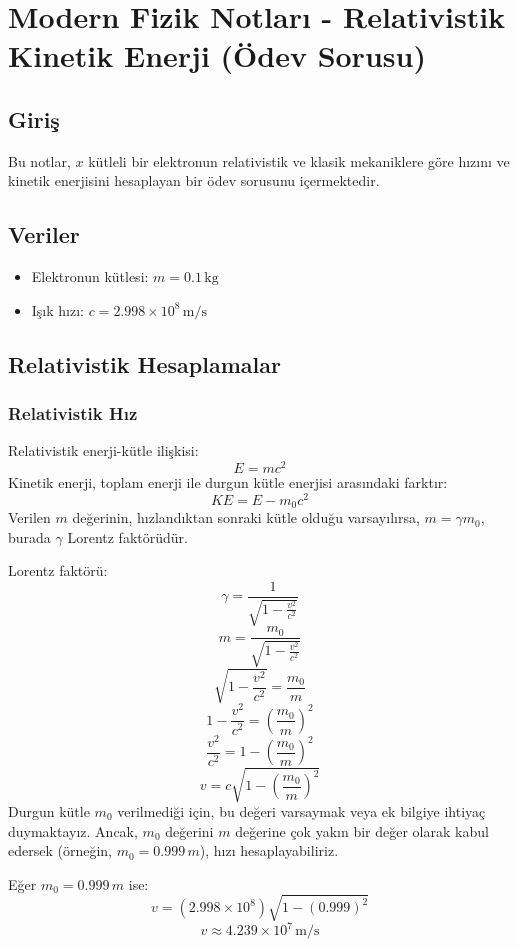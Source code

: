 \documentclass{article}
\begin{document}
\section{Modern Fizik Notları - Relativistik Kinetik Enerji (Ödev Sorusu)}

\subsection{Giriş}
Bu notlar, \( x \) kütleli bir elektronun relativistik ve klasik mekaniklere göre hızını ve kinetik enerjisini hesaplayan bir ödev sorusunu içermektedir.

\subsection{Veriler}
\begin{itemize}
    \item Elektronun kütlesi: \( m = 0.1 \, \text{kg} \)
    \item Işık hızı: \( c = 2.998 \times 10^8 \, \text{m/s} \)
\end{itemize}

\subsection{Relativistik Hesaplamalar}
\subsubsection{Relativistik Hız}
Relativistik enerji-kütle ilişkisi:
\[ E = mc^2 \]
Kinetik enerji, toplam enerji ile durgun kütle enerjisi arasındaki farktır:
\[ KE = E - m_0c^2 \]
Verilen \( m \) değerinin, hızlandıktan sonraki kütle olduğu varsayılırsa, \( m = \gamma m_0 \), burada \( \gamma \) Lorentz faktörüdür.

Lorentz faktörü:
\[ \gamma = \frac{1}{\sqrt{1 - \frac{v^2}{c^2}}} \]
\[ m = \frac{m_0}{\sqrt{1 - \frac{v^2}{c^2}}} \]
\[ \sqrt{1 - \frac{v^2}{c^2}} = \frac{m_0}{m} \]
\[ 1 - \frac{v^2}{c^2} = \left( \frac{m_0}{m} \right)^2 \]
\[ \frac{v^2}{c^2} = 1 - \left( \frac{m_0}{m} \right)^2 \]
\[ v = c \sqrt{1 - \left( \frac{m_0}{m} \right)^2} \]
Durgun kütle \( m_0 \) verilmediği için, bu değeri varsaymak veya ek bilgiye ihtiyaç duymaktayız. Ancak, \( m_0 \) değerini \( m \) değerine çok yakın bir değer olarak kabul edersek (örneğin, \( m_0 = 0.999 \, m \)), hızı hesaplayabiliriz.

Eğer \( m_0 = 0.999 \, m \) ise:
\[ v = (2.998 \times 10^8) \sqrt{1 - (0.999)^2} \]
\[ v \approx 4.239 \times 10^7 \, \text{m/s} \]
\end{document}
